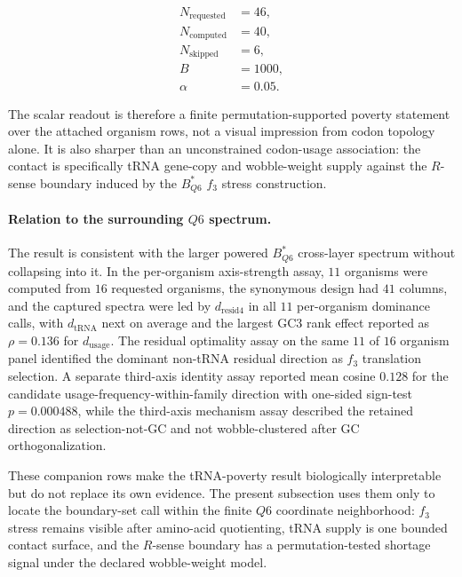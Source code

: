$$\begin{aligned}
N_{\mathrm{requested}} &= 46,\\
N_{\mathrm{computed}} &= 40,\\
N_{\mathrm{skipped}} &= 6,\\
B &= 1000,\\
\alpha &= 0.05.
\end{aligned}$$

The scalar readout is therefore a finite permutation-supported poverty statement over the attached organism rows, not a visual impression from codon topology alone.  It is also sharper than an unconstrained codon-usage association: the contact is specifically tRNA gene-copy and wobble-weight supply against the $R$-sense boundary induced by the $B^{\ast}_{Q6}$ $f_3$ stress construction.

\paragraph{Relation to the surrounding $Q6$ spectrum.}
The result is consistent with the larger powered $B^{\ast}_{Q6}$ cross-layer spectrum without collapsing into it.  In the per-organism axis-strength assay, $11$ organisms were computed from $16$ requested organisms, the synonymous design had $41$ columns, and the captured spectra were led by $d_{\mathrm{resid4}}$ in all $11$ per-organism dominance calls, with $d_{\mathrm{tRNA}}$ next on average and the largest GC3 rank effect reported as $\rho=0.136$ for $d_{\mathrm{usage}}$.  The residual optimality assay on the same $11$ of $16$ organism panel identified the dominant non-tRNA residual direction as $f_3$ translation selection.  A separate third-axis identity assay reported mean cosine $0.128$ for the candidate usage-frequency-within-family direction with one-sided sign-test $p=0.000488$, while the third-axis mechanism assay described the retained direction as selection-not-GC and not wobble-clustered after GC orthogonalization.

These companion rows make the tRNA-poverty result biologically interpretable but do not replace its own evidence.  The present subsection uses them only to locate the boundary-set call within the finite $Q6$ coordinate neighborhood: $f_3$ stress remains visible after amino-acid quotienting, tRNA supply is one bounded contact surface, and the $R$-sense boundary has a permutation-tested shortage signal under the declared wobble-weight model.

